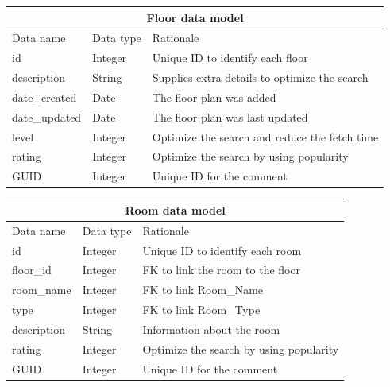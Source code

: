 \documentclass{sig-alt-release2}
\begin{document}
\small{
\begin{tabular}{| p{1.8cm} | p{1cm} | p{4.2cm}|}
\hline
\multicolumn{3}{|c|}{\textbf{Floor data model}} \\
\hline
Data name & Data type & Rationale \\
\hline
id & Integer & Unique ID to identify each floor \\
\hline
description & String & Supplies extra details to optimize the search\\
\hline
date\_created & Date & The floor plan was added\\
\hline
date\_updated & Date & The floor plan was last updated\\
\hline
level & Integer & Optimize the search and reduce the fetch time\\
\hline
rating & Integer & Optimize the search by using popularity\\
\hline
GUID & Integer & Unique ID for the comment\\
\hline
\end{tabular}}	

\vspace{1em}

\begin{tabular}{| p{1.8cm} | p{1cm} | p{4.2cm}|}
\hline
\multicolumn{3}{|c|}{\textbf{Room data model}} \\
\hline
Data name & Data type & Rationale \\
\hline
id & Integer & Unique ID to identify each room \\
\hline
floor\_id & Integer & FK to link the room to the floor\\
\hline
room\_name & Integer & FK to link Room\_Name\\
\hline
type & Integer & FK to link Room\_Type \\
\hline
description & String & Information about the room\\
\hline
rating & Integer & Optimize the search by using popularity\\
\hline
GUID & Integer & Unique ID for the comment\\
\hline
\end{tabular}	
\end{document}
